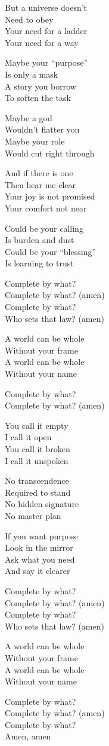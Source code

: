 \begin{lyrics}
But a universe doesn’t\\
Need to obey\\
Your need for a ladder\\
Your need for a way

Maybe your “purpose”\\
Is only a mask\\
A story you borrow\\
To soften the task

Maybe a god\\
Wouldn’t flatter you\\
Maybe your role\\
Would cut right through

And if there is one\\
Then hear me clear\\
Your joy is not promised\\
Your comfort not near

Could be your calling\\
Is burden and dust\\
Could be your “blessing”\\
Is learning to trust

Complete by what?\\
Complete by what? (amen)\\
Complete by what?\\
Who sets that law? (amen)

A world can be whole\\
Without your frame\\
A world can be whole\\
Without your name

Complete by what?\\
Complete by what? (amen)

You call it empty\\
I call it open\\
You call it broken\\
I call it unspoken

No transcendence\\
Required to stand\\
No hidden signature\\
No master plan

If you want purpose\\
Look in the mirror\\
Ask what you need\\
And say it clearer

Complete by what?\\
Complete by what? (amen)\\
Complete by what?\\
Who sets that law? (amen)

A world can be whole\\
Without your frame\\
A world can be whole\\
Without your name

Complete by what?\\
Complete by what? (amen)\\
Complete by what?\\
Amen, amen
\end{lyrics}

